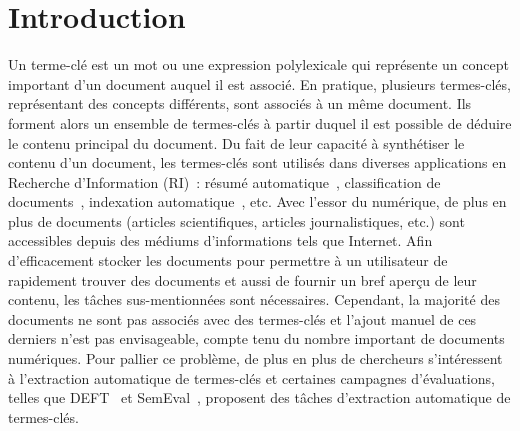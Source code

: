 \section{Introduction}
\label{sec:introduction}
  Un terme-clé est un mot ou une expression polylexicale qui représente un
  concept important d'un document auquel il est associé. En pratique, plusieurs
  termes-clés, représentant des concepts différents, sont associés à un même
  document. Ils forment alors un ensemble de termes-clés à partir duquel il est
  possible de déduire le contenu principal du document. Du fait de leur capacité
  à synthétiser le contenu d'un document, les termes-clés sont utilisés dans
  diverses applications en Recherche d'Information (RI)~: résumé
  automatique~\cite{avanzo2005keyphrase}, classification de
  documents~\cite{han2007webdocumentclustering}, indexation
  automatique~\cite{medelyan2008smalltrainingset}, etc. Avec l'essor du
  numérique, de plus en plus de documents (articles scientifiques, articles
  journalistiques, etc.) sont accessibles depuis des médiums d'informations tels
  que Internet. Afin d'efficacement stocker les documents pour permettre à un
  utilisateur de rapidement trouver des documents et aussi de fournir un bref
  aperçu de leur contenu, les tâches sus-mentionnées sont nécessaires.
  Cependant, la majorité des documents ne sont pas associés avec des termes-clés
  et l'ajout manuel de ces derniers n'est pas envisageable, compte tenu du
  nombre important de documents numériques. Pour pallier ce problème, de plus en
  plus de chercheurs s'intéressent à l'extraction automatique de termes-clés et
  certaines campagnes d'évaluations, telles que DEFT~\cite{paroubek2012deft} et
  SemEval~\cite{kim2010semeval}, proposent des tâches d'extraction automatique
  de termes-clés.

